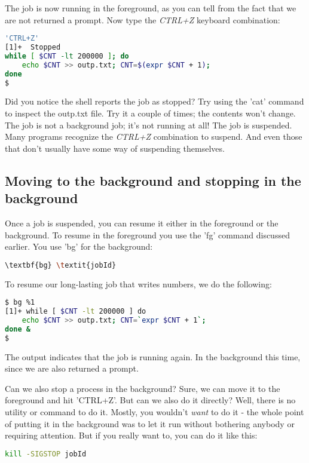 The job is now running in the foreground, as you can tell from the fact that we
are not returned a prompt. Now type the \textit{CTRL+Z} keyboard combination:

\lstset{basicstyle=\scriptsize, numbers=left, captionpos=b, tabsize=4}
\begin{lstlisting}[caption=Stopping the job,language={bash},
xleftmargin=15pt, label=lst:Stopping the job]
'CTRL+Z'
[1]+  Stopped 
while [ $CNT -lt 200000 ]; do
    echo $CNT >> outp.txt; CNT=$(expr $CNT + 1);
done
$
\end{lstlisting}

Did you notice the shell reports the job as stopped? Try using the 'cat'
command to inspect the outp.txt file. Try it a couple of times; the contents
won't change. The job is not a background job; it's not running at all! The job
is suspended. Many programs recognize the \textit{CTRL+Z} combination to suspend.
And even those that don't usually have some way of suspending themselves.

\subsection{Moving to the background and stopping in the background}
Once a job is suspended, you can resume it either in the foreground or the
background. To resume in the foreground you use the 'fg' command discussed
earlier. You use 'bg' for the background:

\lstset{basicstyle=\scriptsize, numbers=left, captionpos=b, tabsize=4}
\begin{lstlisting}[language={bash},
xleftmargin=15pt]
\textbf{bg} \textit{jobId}
\end{lstlisting}

To resume our long-lasting job that writes numbers, we do the following:

\lstset{basicstyle=\scriptsize, numbers=left, captionpos=b, tabsize=4}
\begin{lstlisting}[caption=Resuming the job in the background,language={bash},
xleftmargin=15pt, label=lst:Resuming the job in the background]
$ bg %1
[1]+ while [ $CNT -lt 200000 ] do
    echo $CNT >> outp.txt; CNT=`expr $CNT + 1`;
done &
$
\end{lstlisting}


The output indicates that the job is running again. In the background this
time, since we are also returned a prompt.

Can we also stop a process in the background? Sure, we can move it to the
foreground and hit 'CTRL+Z'. But can we also do it directly? Well, there is no
utility or command to do it. Mostly, you wouldn't \textit{want} to do it - the
whole point of putting it in the background was to let it run without bothering
anybody or requiring attention. But if you really want to, you can do it like
this:
\lstset{basicstyle=\scriptsize, numbers=left, captionpos=b, tabsize=4}
\begin{lstlisting}[language={bash},
xleftmargin=15pt]
kill -SIGSTOP jobId
\end{lstlisting}

